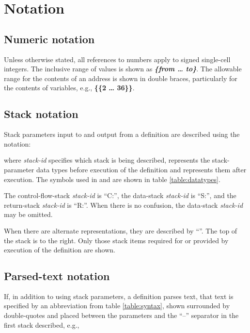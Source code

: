 \section{Notation} %

\subsection{Numeric notation}

Unless otherwise stated, all references to numbers apply to signed
single-cell integers. The inclusive range of values is shown as
\textit{\textbf{\{from {\ldots} to\}}}. The allowable range for the
contents of an address is shown in double braces, particularly for
the contents of variables, e.g., 
\textbf{\{\{2 {\ldots} 36\}\}}.

\subsection{Stack notation}

Stack parameters input to and output from a definition are described
using the notation:
\begin{quote}
\end{quote}

where \emph{stack-id} specifies which stack is being described,
 represents the stack-parameter data types before
execution of the definition and  represents them
after execution. The symbols used in  and 
are shown in table \ref{table:datatypes}.

The control-flow-stack \emph{stack-id} is ``C:'', the data-stack
\emph{stack-id} is ``S:'', and the return-stack \emph{stack-id}
is ``R:''. When there is no confusion, the data-stack
\emph{stack-id} may be omitted.

When there are alternate  representations, they are
described by ``''. The top of the stack is
to the right. Only those stack items required for or provided by
execution of the definition are shown.


\subsection{Parsed-text notation}

If, in addition to using stack parameters, a definition parses text,
that text is specified by an abbreviation from table \ref{table:syntax},
shown surrounded by double-quotes and placed between the 
parameters and the ``--'' separator in the first stack described, e.g.,

